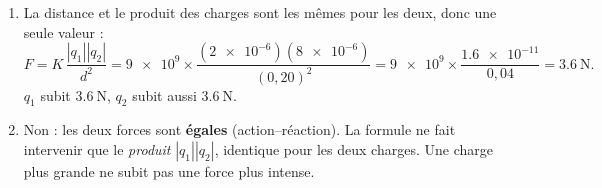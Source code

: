 \documentclass[11pt,a4paper]{article}
\begin{document}
\begin{corrige}
\begin{enumerate}[label=\alph*)]
  \item La distance et le produit des charges sont les mêmes pour les deux, donc une seule valeur :
        \[ F = K\,\frac{|q_1||q_2|}{d^2}
             = \num{9e9}\times\frac{(\num{2e-6})(\num{8e-6})}{(0{,}20)^2}
             = \num{9e9}\times\frac{\num{1.6e-11}}{0{,}04} = \SI{3.6}{\newton}. \]
        $q_1$ subit $\SI{3.6}{\newton}$, $q_2$ subit aussi $\SI{3.6}{\newton}$.
  \item Non : les deux forces sont \textbf{égales} (action--réaction). La formule ne fait
        intervenir que le \emph{produit} $|q_1||q_2|$, identique pour les deux charges. Une charge
        plus grande ne subit pas une force plus intense.
\end{enumerate}
\end{corrige}
\end{document}
